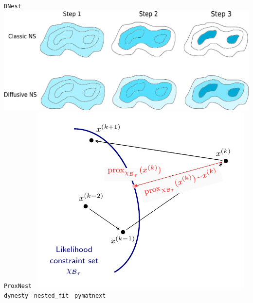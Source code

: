 \documentclass[aspectratio=169]{beamer}
\begin{document}
\begin{frame}
\begin{columns}[t]
        \vfill
        \texttt{DNest}~
        \includegraphics[width=\textwidth]{figures/dnest}
        \texttt{ProxNest}~
        \includegraphics[width=\textwidth]{figures/proxnest_diagram}
        \texttt{dynesty}~ 
        \texttt{nested\_fit}~
        \texttt{pymatnext}~
        \vfill
    \end{columns}
\end{frame}
\end{document}
